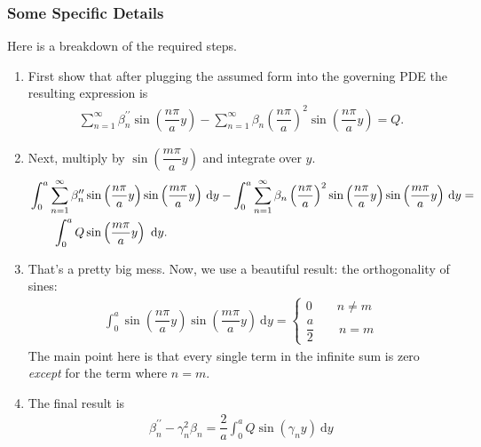 \documentclass[11pt]{article}
\begin{document}
    \subsubsection{Some Specific Details}
    Here is a breakdown of the required steps.
    \begin{enumerate}
      \item First show that after plugging the assumed form into the governing PDE the
resulting expression is 
      \begin{align}
        \sum_{n=1}^{\infty}{\beta_{n}^{\prime\prime}\sin\left(\dfrac{n\pi}{a}y\right)} -
\sum_{n=1}^{\infty}{\beta_{n}\left(\dfrac{n\pi}{a}\right)^{2}\sin\left(\dfrac{n\pi}{a}y\right)} = Q.
      \end{align}
      \item Next, multiply by $\sin\left(\dfrac{m\pi}{a}y\right)$ and integrate over $y$.
      \begin{align}
        &\int_{0}^{a}{\sum_{n=1}^{\infty}{\beta_{n}^{\prime\prime}\sin\left(\dfrac{n\pi}{a}y\right)\sin\left(\dfrac{m\pi}{a}y\right)}
\ \mathrm{d}y} -
\int_{0}^{a}{\sum_{n=1}^{\infty}{\beta_{n}\left(\dfrac{n\pi}{a}\right)^{2}\sin\left(\dfrac{n\pi}{a}y\right)\sin\left(\dfrac{m\pi}{a}y\right)}
\ \mathrm{d}y} = \nonumber \\
        &\hspace{2.0em}\int_{0}^{a}{Q\sin\left(\dfrac{m\pi}{a}y\right) \ \mathrm{d}y}.
      \end{align}
      \item That's a pretty big mess.  Now, we use a beautiful result:  the orthogonality of sines:
        \begin{align}
          \int_{0}^{a}{\sin\left(\dfrac{n\pi}{a}y\right)\sin\left(\dfrac{m\pi}{a}y\right) \ \mathrm{d}y} = 
          \left\{
            \begin{array}{ll}
              0            \qquad n \neq m \\
              \dfrac{a}{2} \qquad n = m
            \end{array}
          \right.
        \end{align}
        The main point here is that every single term in the infinite sum is zero \textit{except} for the term where $n=m$.
      \item The final result is 
        \begin{align}
          \beta_{n}^{\prime\prime} - \gamma_{n}^{2}\beta_{n} = \dfrac{2}{a}\int_{0}^{a}{Q\sin\left(\gamma_{n}y\right) \ \mathrm{d}y}
        \end{align}
    \end{enumerate}
\end{document}
